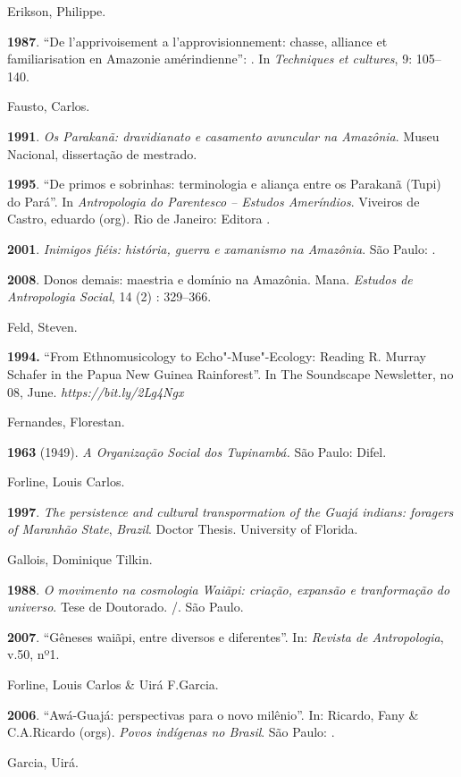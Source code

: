 Erikson, Philippe.

\textbf{1987}. ``De l'apprivoisement a l'approvisionnement: chasse,
alliance et familiarisation en Amazonie amérindienne'': . In
\emph{Techniques et cultures}, 9: 105--140.

Fausto, Carlos.

\textbf{1991}. \emph{Os Parakanã: dravidianato e casamento avuncular na
Amazônia}. Museu Nacional, dissertação de mestrado.

\textbf{1995}. ``De primos e sobrinhas: terminologia e aliança entre os
Parakanã (Tupi) do Pará''. In \emph{Antropologia do Parentesco -- Estudos
Ameríndios}. Viveiros de Castro, eduardo (org). Rio de Janeiro: Editora
.

\textbf{2001}. \emph{Inimigos fiéis: história, guerra e xamanismo na
Amazônia}. São Paulo: .

\textbf{2008}. Donos demais: maestria e domínio na Amazônia. Mana.
\emph{Estudos de Antropologia Social}, 14 (2) : 329--366.

Feld, Steven.

\textbf{1994.} ``From Ethnomusicology to Echo"-Muse"-Ecology: Reading R.
Murray Schafer in the Papua New Guinea Rainforest''. In The Soundscape
Newsletter, no 08, June.
\emph{https://bit.ly/2Lg4Ngx}

Fernandes, Florestan.

\textbf{1963} (1949). \emph{A Organização Social dos Tupinambá.} São
Paulo: Difel.

Forline, Louis Carlos.

\textbf{1997}. \emph{The persistence and cultural transpormation of the
Guajá indians: foragers of Maranhão State}, \emph{Brazil}. Doctor
Thesis. University of Florida.

Gallois, Dominique Tilkin.

\textbf{1988}. \emph{O movimento na cosmologia Waiãpi: criação, expansão
e tranformação do universo}. Tese de Doutorado. /. São Paulo.

\textbf{2007}. ``Gêneses waiãpi, entre diversos e diferentes''. In:
\emph{Revista de Antropologia}, v.50, nº1.

Forline, Louis Carlos \& Uirá F.Garcia.

\textbf{2006}. ``Awá-Guajá: perspectivas para o novo milênio''. In:
Ricardo, Fany \& C.A.Ricardo (orgs). \emph{Povos indígenas no Brasil}.
São Paulo: .

Garcia, Uirá.

